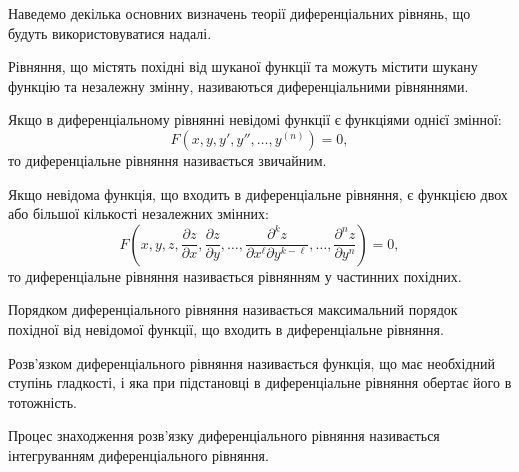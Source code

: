 Наведемо декілька основних визначень теорії диференціальних рівнянь, що будуть використовуватися надалі.

\begin{definition}
	Рівняння, що містять похідні від шуканої функції та можуть містити шукану функцію та незалежну змінну, називаються диференціальними рівняннями.
\end{definition}

\begin{definition}
	Якщо в диференціальному рівнянні невідомі функції є функціями однієї змінної:
	\begin{equation*}
		F \left( x, y, y', y'', \ldots, y^{(n)} \right) = 0,
	\end{equation*}
	то диференціальне рівняння називається звичайним.
\end{definition}

\begin{definition}
	Якщо невідома функція, що входить в диференціальне рівняння, є функцією двох або більшої кількості незалежних змінних:
	\begin{equation*}
		F \left( x, y, z, \frac{\partial z}{\partial x}, \frac{\partial z}{\partial y}, \ldots, \frac{\partial^k z}{\partial x^\ell \partial y^{k - \ell}}, \ldots, \frac{\partial^n z}{\partial y^n} \right) = 0,
	\end{equation*}
	то диференціальне рівняння називається рівнянням у частинних похідних.
\end{definition}

\begin{definition}
	Порядком диференціального рівняння називається максимальний порядок похідної від невідомої функції, що входить в диференціальне рівняння.
\end{definition}

\begin{definition}
	Розв'язком диференціального рівняння називається функція, що має необхідний ступінь гладкості, і яка при підстановці в диференціальне рівняння обертає його в тотожність. 
\end{definition}

\begin{definition}
	Процес знаходження розв'язку диференціального рівняння називається інтегруванням диференціального рівняння.
\end{definition}
